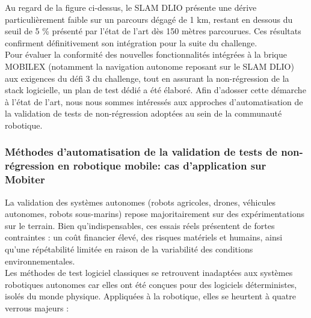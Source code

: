 Au regard de la figure ci-dessus, le SLAM DLIO présente une dérive particulièrement faible sur un parcours dégagé de 1 km, restant en dessous du seuil de 5 \% présenté par l'état de l'art dès 150 mètres parcourues. Ces résultats confirment définitivement son intégration pour la suite du challenge.\\

Pour évaluer la conformité des nouvelles fonctionnalités intégrées à la brique MOBILEX (notamment la navigation autonome reposant sur le SLAM DLIO) aux exigences du défi 3 du challenge, tout en assurant la non-régression de la stack logicielle, un plan de test dédié a été élaboré. Afin d'adosser cette démarche à l'état de l'art, nous nous sommes intéressés aux approches d'automatisation de la validation de tests de non-régression adoptées au sein de la communauté robotique.




\subsubsection{Méthodes d'automatisation de la validation de tests de non-régression en robotique mobile: cas d'application sur Mobiter}

La validation des systèmes autonomes (robots agricoles, drones, véhicules autonomes, robots sous-marins) repose majoritairement sur des expérimentations sur le terrain. Bien qu'indispensables, ces essais réels présentent de fortes contraintes : un coût financier élevé, des risques matériels et humains, ainsi qu'une répétabilité limitée en raison de la variabilité des conditions environnementales.\\

Les méthodes de test logiciel classiques se retrouvent inadaptées aux systèmes robotiques autonomes car elles ont été conçues pour des logiciels déterministes, isolés du monde physique. Appliquées à la robotique, elles se heurtent à quatre verrous majeurs \cite{2021TOU30119a} :\\

